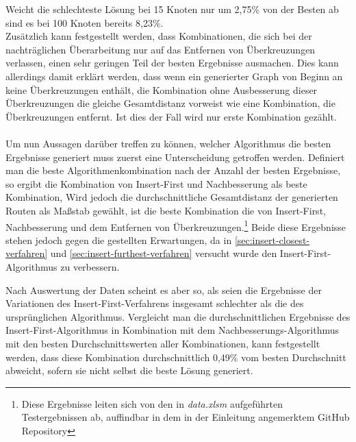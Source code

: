 Weicht die schlechteste Lösung bei 15 Knoten nur um 2,75\% von der Besten ab sind es bei 100 Knoten bereits 8,23\%.
\\
Zusätzlich kann festgestellt werden, dass Kombinationen, die sich bei der nachträglichen Überarbeitung nur auf das Entfernen von Überkreuzungen verlassen, einen sehr geringen Teil der besten Ergebnisse ausmachen.
Dies kann allerdings damit erklärt werden, dass wenn ein generierter Graph von Beginn an keine Überkreuzungen enthält, die Kombination ohne Ausbesserung dieser Überkreuzungen die gleiche Gesamtdistanz vorweist wie eine Kombination, die Überkreuzungen entfernt.
Ist dies der Fall wird nur erste Kombination gezählt.
\\\\
Um nun Aussagen darüber treffen zu können, welcher Algorithmus die besten Ergebnisse generiert muss zuerst eine Unterscheidung getroffen werden.
Definiert man die beste Algorithmenkombination nach der Anzahl der besten Ergebnisse, so ergibt die Kombination von Insert-First und Nachbesserung als beste Kombination,
Wird jedoch die durchschnittliche Gesamtdistanz der generierten Routen als Maßstab gewählt, ist die beste Kombination die von Insert-First, Nachbesserung und dem Entfernen von Überkreuzungen.\footnote{Diese Ergebnisse leiten sich von den in \textit{data.xlsm} aufgeführten Testergebnissen ab, auffindbar in dem in der Einleitung angemerktem GitHub Repository}
Beide diese Ergebnisse stehen jedoch gegen die gestellten Erwartungen, da in \vref{sec:insert-closest-verfahren} und \vref{sec:insert-furthest-verfahren} versucht wurde den Insert-First-Algorithmus zu verbessern.

Nach Auswertung der Daten scheint es aber so, als seien die Ergebnisse der Variationen des Insert-First-Verfahrens insgesamt schlechter als die des ursprünglichen Algorithmus.
Vergleicht man die durchschnittlichen Ergebnisse des Insert-First-Algorithmus in Kombination mit dem Nachbesserungs-Algorithmus mit den besten Durchschnittswerten aller Kombinationen, kann festgestellt werden, dass diese Kombination durchschnittlich 0,49\% vom besten Durchschnitt abweicht, sofern sie nicht selbst die beste Lösung generiert.



